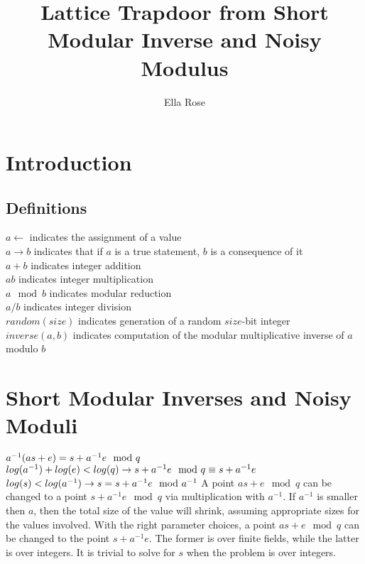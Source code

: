 \documentclass[preprint]{iacrtrans}
\author{Ella Rose}
\institute{Paso Robles, CA \email{python_pride@protonmail.com}}
\title[Lattice Trapdoor from Short Modular Inverse and Noisy Modulus]{Lattice Trapdoor from Short Modular Inverse and Noisy Modulus}
\begin{document}
\maketitle


\begin{abstract}

 \end{abstract}

\section{Introduction}

\subsection{Definitions}
$a \leftarrow$ indicates the assignment of a value\\
$a \rightarrow b$ indicates that if $a$ is a true statement, $b$ is a consequence of it\\
$a + b$ indicates integer addition\\
$a b$ indicates integer multiplication\\
$a \mod b$ indicates modular reduction\\
$a / b$ indicates integer division\\
$random(size)$ indicates generation of a random $size$-bit integer\\
$inverse(a, b)$ indicates computation of the modular multiplicative inverse of $a$ modulo $b$\\

\section{Short Modular Inverses and Noisy Moduli}
$a^{-1} (a s + e) = s + a^{-1} e \mod q\\$
$log(a^{-1}) + log(e) < log(q) \rightarrow s + a^{-1} e \mod q \equiv s + a^{-1} e\\$
$log(s) < log(a^{-1}) \rightarrow s = s + a^{-1} e \mod a^{-1}\\$
A point $a s + e \mod q$  can be changed to a point $s + a^{-1} e \mod q$ via multiplication with $a^{-1}$. If $a^{-1}$ is smaller then $a$, then the total size of the value will shrink, assuming appropriate sizes for the values involved. With the right parameter choices, a point $a s + e \mod q$ can be changed to the point $s + a^{-1} e$. The former is over finite fields, while the latter is over integers. It is trivial to solve for $s$ when the problem is over integers.
\end{document}
